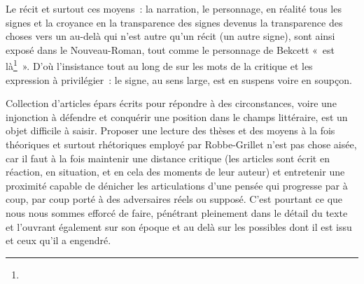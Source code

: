 \documentclass[12pt, a4paper]{article}
\begin{document}
Le récit et surtout ces moyens~: la narration, le personnage, en réalité tous les signes et la croyance en la transparence des signes devenus la transparence des choses vers un au-delà qui n'est autre qu'un récit (un autre signe), sont ainsi exposé dans le Nouveau-Roman, tout comme le personnage de Bekcett «~est là\footnote{}~». D'où l'insistance tout au long de \punr{} sur les mots de la critique et les expression à privilégier~: le signe, au sens large, est en suspens voire en soupçon.










\newpage

\vspace*{4cm}

Collection d'articles épars écrits pour répondre à des circonstances, voire une injonction à défendre et conquérir une position dans le champs littéraire, \punr{} est un objet difficile à saisir. Proposer une lecture des thèses et des moyens à la fois théoriques et surtout rhétoriques employé par Robbe-Grillet n'est pas chose aisée, car il faut à la fois maintenir une distance critique (les articles sont écrit en réaction, en situation, et en cela des moments de leur auteur) et entretenir une proximité capable de dénicher les articulations d'une pensée qui progresse par à coup, par coup porté à des adversaires réels ou supposé. C'est pourtant ce que nous nous sommes efforcé de faire, pénétrant pleinement dans le détail du texte et l'ouvrant également sur son époque et au delà sur les possibles dont il est issu et ceux qu'il a engendré.
\end{document}
